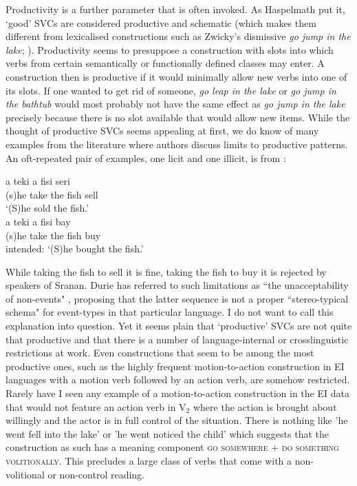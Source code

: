 Productivity is a further parameter that is often invoked. As Haspelmath put it, `good' SVCs are considered productive and schematic (which makes them different from lexicalised constructions such as Zwicky's dismissive \textit{go jump in the lake}; \citealt[9]{zwicky1990we}). Productivity seems to presuppose a construction with slots into which verbs from certain semantically or functionally defined classes may enter. A construction then is productive if it would minimally allow new verbs into one of its slots. If one wanted to get rid of someone, \textit{go leap in the lake} or \textit{go jump in the bathtub} would most probably not have the same effect as \textit{go jump in the lake} precisely because there is no slot available that would allow new items. While the thought of productive SVCs seems appealing at first, we do know of many examples from the literature where authors discuss limits to productive patterns. An oft-repeated pair of examples, one licit and one illicit, is from \textcite{sebba1987syntax}:

\ea \label{}
\ea
\gll a teki a fisi seri \\
(s)he take the fish sell \\
\glft `(S)he sold the fish.' \\ 
\ex
\gll *a teki a fisi bay \\ 
(s)he take the fish buy \\
\glft intended: `(S)he bought the fish.'\\ 
\z
\z

While taking the fish to sell it is fine, taking the fish to buy it is rejected by speakers of Sranan. Durie has referred to such limitations as ``the unacceptability of non-events" \citep[327]{Durie1997}, proposing that the latter sequence is not a proper ``stereo-typical schema" for event-types in that particular language. I do not want to call this explanation into question. Yet it seems plain that `productive' SVCs are not quite that productive and that there is a number of language-internal or crosslinguistic restrictions at work. Even constructions that seem to be among the most productive ones, such as the highly frequent motion-to-action construction in EI languages with a motion verb followed by an action verb, are somehow restricted. Rarely have I seen any example of a motion-to-action construction in the EI data that would not feature an action verb in V$_2$ where the action is brought about willingly and the actor is in full control of the situation. There is nothing like 'he went fell into the lake' or 'he went noticed the child' which suggests that the construction as such has a meaning component \textsc{go somewhere + do something volitionally}. This precludes a large class of verbs that come with a non-volitional or non-control reading.

